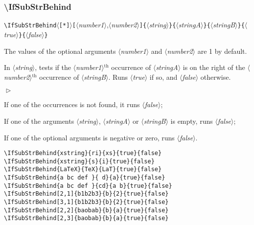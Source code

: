 \documentclass[a4paper,10pt]{article}
\newcommand\argu[1]{$\langle$\textit{#1}$\rangle$}
\newcommand\ARGU[1]{\texttt{\{}\argu{#1}\texttt{\}}}
\newcommand\arguCC[2]{\texttt{[}\argu{#1}{,}\argu{#2}\texttt{]}}
\newcommand\etoile{$\langle$\texttt{[*]}$\rangle$}
\newenvironment{Conditions}[1][1cm]%
{\begin{list}%
	{$\vartriangleright$}%
	{\setlength{\leftmargin}{#1}
	 \setlength{\itemsep}{0pt}
	 \setlength{\parsep}{0pt}
	 \setlength{\topsep}{2ptplus3ptminus2pt}
	}}%
{\end{list}}
\renewcommand\th{${}^\text{th}$\xspace}
\newcommand\styleexemple{\small\vskip4pt}
\newcommand\verbinline{\lstinline[basicstyle=\normalsize\ttfamily]}
\begin{document}
\subsubsection{\ttfamily\textbackslash IfSubStrBehind}

\verbinline|\IfSubStrBehind|\etoile\arguCC{number1}{number2}\ARGU{string}\ARGU{stringA}\ARGU{stringB}\ARGU{true}\ARGU{false}
\smallskip

The values of the optional arguments \argu{number1} and \argu{number2} are 1 by default.\par\smallskip

In \argu{string}, tests if the \argu{number1}\th occurrence of \argu{stringA} is on the right of the \argu{number2}\th occurrence of \argu{stringB}. Runs \argu{true} if so, and \argu{false} otherwise.\medskip

\begin{Conditions}
\item If one of the occurrences is not found, it runs \argu{false};
\item If one of the arguments \argu{string}, \argu{stringA} or \argu{stringB} is empty, runs \argu{false};
\item If one of the optional arguments is negative or zero, runs \argu{false}.
\end{Conditions}

\begin{minipage}[t]{0.65\linewidth}
\begin{lstlisting}
\IfSubStrBehind{xstring}{ri}{xs}{true}{false}
\IfSubStrBehind{xstring}{s}{i}{true}{false}
\IfSubStrBehind{LaTeX}{TeX}{LaT}{true}{false}
\IfSubStrBehind{a bc def }{ d}{a}{true}{false}
\IfSubStrBehind{a bc def }{cd}{a b}{true}{false}
\IfSubStrBehind[2,1]{b1b2b3}{b}{2}{true}{false}
\IfSubStrBehind[3,1]{b1b2b3}{b}{2}{true}{false}
\IfSubStrBehind[2,2]{baobab}{b}{a}{true}{false}
\IfSubStrBehind[2,3]{baobab}{b}{a}{true}{false}
\end{lstlisting}%
\end{minipage}\hfill
\begin{minipage}[t]{0.35\linewidth}
	\styleexemple
	\par
	\par
	\par
	\par
	\par
	\par
	\par
	\par
\end{minipage}%
\end{document}
